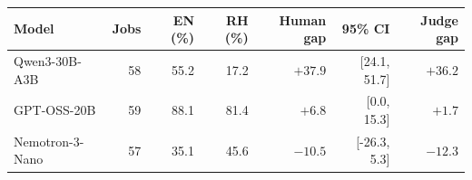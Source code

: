 \begin{tabular}{lrrrrrr}
\toprule
Model & Jobs & EN (\%) & RH (\%) & Human gap & 95\% CI & Judge gap \\
\midrule
Qwen3-30B-A3B & 58 & 55.2 & 17.2 & $+37.9$ & [24.1, 51.7] & $+36.2$ \\
GPT-OSS-20B & 59 & 88.1 & 81.4 & $+6.8$ & [0.0, 15.3] & $+1.7$ \\
Nemotron-3-Nano & 57 & 35.1 & 45.6 & $-10.5$ & [-26.3, 5.3] & $-12.3$ \\
\bottomrule
\end{tabular}
